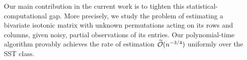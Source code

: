 \documentclass[final,12pt]{colt2018} %
\begin{document}
Our main contribution in the current work is to tighten this statistical-computational gap. More precisely, we study
the problem of estimating a bivariate isotonic matrix with unknown
permutations acting on its rows and columns, given noisy, partial
observations of its entries. Our polynomial-time algorithm provably achieves the rate of estimation $\widetilde {\mathcal{O}}(n^{-3/4})$ uniformly over the SST class.


\end{document}
